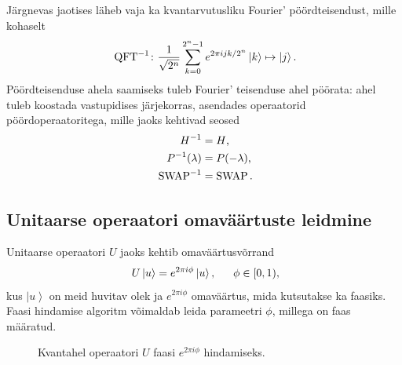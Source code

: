 \documentclass[12pt]{report}
\def\ket#1{\left|#1\right>}
\def\SWAP{\mathop{\rm SWAP}\nolimits}
\def\QFT{\mathop{\rm QFT}\nolimits}
\begin{document}
Järgnevas jaotises läheb vaja ka kvantarvutusliku Fourier' pöördteisendust, mille kohaselt
\begin{align}\label{eq:iqftdef}
    \QFT^{-1}\colon
    \frac{1}{\sqrt{2^n}} \sum_{k=0}^{2^n-1} e^{2\pi ijk/2^n} \ket{k} \mapsto \ket{j} \rlap{.}
\end{align}
Pöördteisenduse ahela saamiseks tuleb Fourier' teisenduse ahel pöörata: ahel tuleb koostada vastupidises järjekorras, asendades operaatorid pöördoperaatoritega, mille jaoks kehtivad seosed
\begin{align}
    H^{-1} &= H \rlap{,} \\
    P^{-1}(\lambda) &= P(-\lambda) \rlap{,} \\
    \SWAP^{-1} &= \SWAP \rlap{.}
\end{align}

\subsection{Unitaarse operaatori omaväärtuste leidmine}\label{sec:unit}

Unitaarse operaatori \(U\) jaoks kehtib omaväärtusvõrrand
\begin{align}\label{eq:uniteigen}
    U\ket{u} = e^{2\pi i\phi}\ket{u} \rlap{,}
    \qquad \phi \in [0,1) \rlap{,}
\end{align}
kus \(\ket{u}\) on meid huvitav olek ja \(e^{2\pi i\phi}\) omaväärtus, mida kutsutakse ka faasiks.
Faasi hindamise algoritm võimaldab leida parameetri \(\phi\), millega on faas määratud.

\begin{figure}[h]
    \centering
    \ifdefined\yquanton
    \fi
    \caption{Kvantahel operaatori \(U\) faasi \(e^{2\pi i\phi}\) hindamiseks.}
    \label{fig:pea}
\end{figure}
\end{document}
